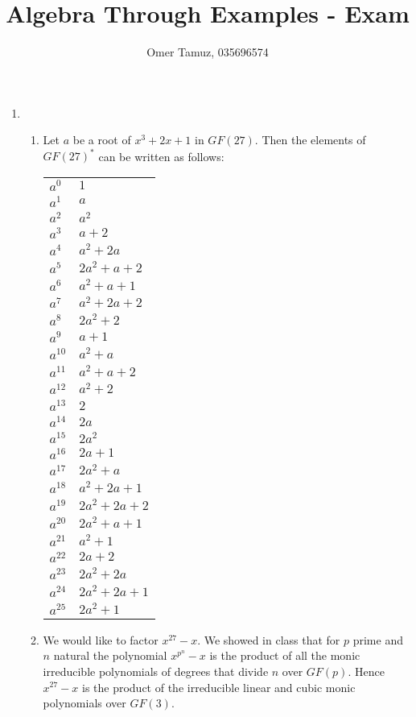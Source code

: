 \documentclass[11pt]{article} \usepackage{amssymb}
\begin{document}
\title{Algebra Through Examples - Exam}

 \author{Omer Tamuz, 035696574}
\maketitle


\begin{enumerate}
\item 
  \begin{enumerate}
  \item 
    Let $a$ be a root of $x^3+2x+1$ in $GF(27)$. Then the elements of $GF(27)^*$
    can be written as follows:

    \begin{tabular}{l| l}
      $a^{0}$ & $1$\\
      $a^{1}$ & $a$\\
      $a^{2}$ & $a^{2}$\\
      $a^{3}$ & $a+2$\\
      $a^{4}$ & $a^{2}+2a$\\
      $a^{5}$ & $2a^{2}+a+2$\\
      $a^{6}$ & $a^{2}+a+1$\\
      $a^{7}$ & $a^{2}+2a+2$\\
      $a^{8}$ & $2a^{2}+2$\\
      $a^{9}$ & $a+1$\\
      $a^{10}$ & $a^{2}+a$\\
      $a^{11}$ & $a^{2}+a+2$\\
      $a^{12}$ & $a^{2}+2$\\
      $a^{13}$ & $2$\\
      $a^{14}$ & $2a$\\
      $a^{15}$ & $2a^{2}$\\
      $a^{16}$ & $2a+1$\\
      $a^{17}$ & $2a^{2}+a$\\
      $a^{18}$ & $a^{2}+2a+1$\\
      $a^{19}$ & $2a^{2}+2a+2$\\
      $a^{20}$ & $2a^{2}+a+1$\\
      $a^{21}$ & $a^{2}+1$\\
      $a^{22}$ & $2a+2$\\
      $a^{23}$ & $2a^{2}+2a$\\
      $a^{24}$ & $2a^{2}+2a+1$\\
      $a^{25}$ & $2a^{2}+1$\\
    \end{tabular}
  \item
    We would like to factor $x^{27}-x$. We showed in class that for $p$ 
    prime and $n$ natural the 
    polynomial $x^{p^n}-x$ is the product of all the monic irreducible 
    polynomials of degrees that divide $n$ over $GF(p)$. Hence $x^{27}-x$
    is the product of the irreducible linear and cubic monic polynomials
    over $GF(3)$.


\end{enumerate}
\end{enumerate}
\end{document}
